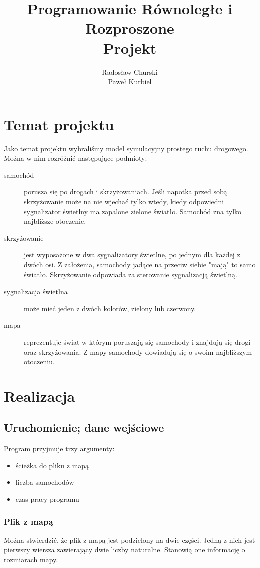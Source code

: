 \documentclass[a4paper]{article}
\title{Programowanie Równoległe i Rozproszone\\Projekt}
\author{Radosław Churski \\ Paweł Kurbiel}
\begin{document}
\begin{titlepage}
\maketitle
\end{titlepage}
\tableofcontents
\section{Temat projektu}
Jako temat projektu wybraliśmy model symulacyjny prostego ruchu drogowego. Można w nim rozróżnić następujące podmioty:
\begin{description}
\item[samochód] porusza się po drogach i skrzyżowaniach. Jeśli napotka przed sobą skrzyżowanie może na nie wjechać tylko wtedy, kiedy odpowiedni sygnalizator świetlny ma zapalone zielone światło. Samochód zna tylko najbliższe otoczenie.
\item[skrzyżowanie] jest wyposażone w dwa sygnalizatory świetlne, po jednym dla każdej z dwóch osi. Z założenia, samochody jadące na przeciw siebie "mają" to samo światło. Skrzyżowanie odpowiada za sterowanie sygnalizacją świetlną.
\item[sygnalizacja świetlna] może mieć jeden z dwóch kolorów, zielony lub czerwony.
\item[mapa] reprezentuje świat w którym poruszają się samochody i znajdują się drogi oraz skrzyżowania. Z mapy samochody dowiadują się o swoim najbliższym otoczeniu.
\end{description}
\section{Realizacja}
\subsection{Uruchomienie; dane wejściowe}
Program przyjmuje trzy argumenty:
\begin{itemize}
\item ścieżka do pliku z mapą
\item liczba samochodów
\item czas pracy programu
\end{itemize}
\subsubsection{Plik z mapą}
Można stwierdzić, że plik z mapą jest podzielony na dwie części. Jedną z nich jest pierwszy wiersza zawierający dwie liczby naturalne. Stanowią one informację o rozmiarach mapy.
\end{document}
